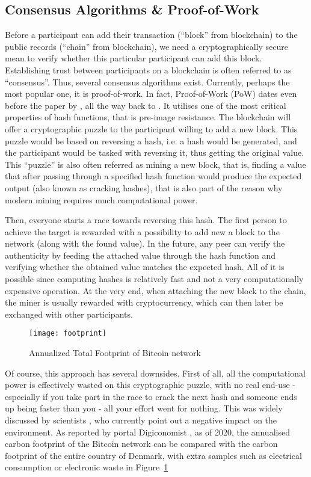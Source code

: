 \subsection{Consensus Algorithms \& Proof-of-Work}\label{sec:pow}
Before a participant can add their transaction (``block'' from blockchain) to the public records (``chain'' from blockchain), we need a cryptographically secure mean to verify whether this particular participant can add this block. Establishing trust between participants on a blockchain is often referred to as ``consensus''. Thus, several consensus algorithms exist. Currently, perhaps the most popular one, it is proof-of-work. In fact, Proof-of-Work (PoW) dates even before the paper by \citet{nakamoto2008peer}, all the way back to \citet{jakobsson1999proofs}. It utilises one of the most critical properties of hash functions, that is pre-image resistance. The blockchain will offer a cryptographic puzzle to the participant willing to add a new block. This puzzle would be based on reversing a hash, i.e. a hash would be generated, and the participant would be tasked with reversing it, thus getting the original value. This ``puzzle'' is also often referred as mining a new block, that is, finding a value that after passing through a specified hash function would produce the expected output (also known as cracking hashes), that is also part of the reason why modern mining requires much computational power. 

Then, everyone starts a race towards reversing this hash. The first person to achieve the target is rewarded with a possibility to add new a block to the network (along with the found value). In the future, any peer can verify the authenticity by feeding the attached value through the hash function and verifying whether the obtained value matches the expected hash. All of it is possible since computing hashes is relatively fast and not a very computationally expensive operation. At the very end, when attaching the new block to the chain, the miner is usually rewarded with cryptocurrency, which can then later be exchanged with other participants.

\begin{figure}[ht]
    \centering
    \texttt{[image: footprint]}
    \caption{Annualized Total Footprint of Bitcoin network \cite{index2017digiconomist}}
    \label{fig:footprint}
\end{figure}

Of course, this approach has several downsides. First of all, all the computational power is effectively wasted on this cryptographic puzzle, with no real end-use - especially if you take part in the race to crack the next hash and someone ends up being faster than you - all your effort went for nothing. This was widely discussed by scientists \cite{gervais2016security}, who currently point out a negative impact on the environment. As reported by portal Digiconomist \cite{index2017digiconomist}, as of 2020, the annualised carbon footprint of the Bitcoin network can be compared with the carbon footprint of the entire country of Denmark, with extra samples such as electrical consumption or electronic waste in Figure~\ref{fig:footprint}

